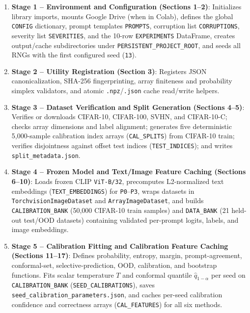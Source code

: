 \documentclass[11pt,a4paper]{article}
\begin{document}
\begin{enumerate}
  \item \textbf{Stage 1 -- Environment and Configuration (Sections 1--2)}: Initializes library imports, mounts Google Drive (when in Colab), defines the global \texttt{CONFIG} dictionary, prompt templates \texttt{PROMPTS}, corruption list \texttt{CORRUPTIONS}, severity list \texttt{SEVERITIES}, and the 10-row \texttt{EXPERIMENTS} DataFrame, creates output/cache subdirectories under \texttt{PERSISTENT\_\allowbreak{}PROJECT\_\allowbreak{}ROOT}, and seeds all RNGs with the first configured seed (\texttt{13}).
  \item \textbf{Stage 2 -- Utility Registration (Section 3)}: Registers JSON canonicalization, SHA-256 fingerprinting, array finiteness and probability simplex validators, and atomic \texttt{.\allowbreak{}npz}/\texttt{.\allowbreak{}json} cache read/write helpers.
  \item \textbf{Stage 3 -- Dataset Verification and Split Generation (Sections 4--5)}: Verifies or downloads CIFAR-10, CIFAR-100, SVHN, and CIFAR-10-C; checks array dimensions and label alignment; generates five deterministic 5,000-sample calibration index arrays (\texttt{CAL\_\allowbreak{}SPLITS}) from CIFAR-10 train; verifies disjointness against offset test indices (\texttt{TEST\_\allowbreak{}INDICES}); and writes \texttt{split\_\allowbreak{}metadata.\allowbreak{}json}.
  \item \textbf{Stage 4 -- Frozen Model and Text/Image Feature Caching (Sections 6--10)}: Loads frozen CLIP \texttt{ViT-B/\allowbreak{}32}, precomputes L2-normalized text embeddings (\texttt{TEXT\_\allowbreak{}EMBEDDINGS}) for \texttt{P0}--\texttt{P3}, wraps datasets in \texttt{TorchvisionImageDataset} and \texttt{ArrayImageDataset}, and builds \texttt{CALIBRATION\_\allowbreak{}BANK} (50,000 CIFAR-10 train samples) and \texttt{DATA\_\allowbreak{}BANK} (21 held-out test/OOD datasets) containing validated per-prompt logits, labels, and image embeddings.
  \item \textbf{Stage 5 -- Calibration Fitting and Calibration Feature Caching (Sections 11--17)}: Defines probability, entropy, margin, prompt-agreement, conformal-set, selective-prediction, OOD, calibration, and bootstrap functions. Fits scalar temperature $T$ and conformal quantile $\hat{q}_{1-\alpha}$ per seed on \texttt{CALIBRATION\_\allowbreak{}BANK} (\texttt{SEED\_\allowbreak{}CALIBRATIONS}), saves \texttt{seed\_\allowbreak{}calibration\_\allowbreak{}parameters.\allowbreak{}json}, and caches per-seed calibration confidence and correctness arrays (\texttt{CAL\_\allowbreak{}FEATURES}) for all six methods.

\end{enumerate}
\end{document}

